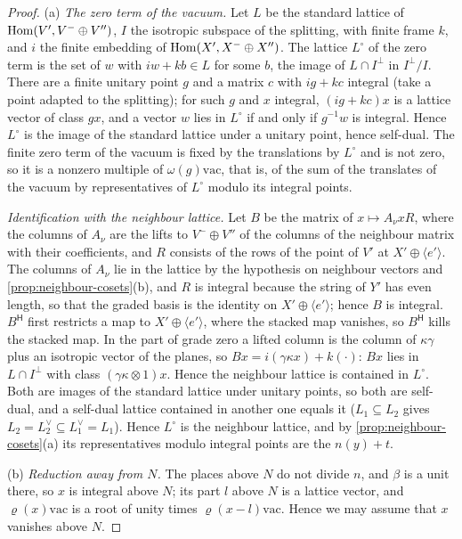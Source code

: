 \begin{proof}
(a) \emph{The zero term of the vacuum.} Let $L$ be the standard lattice of $\operatorname{Hom}(V',V^-\oplus V'')$, $I$ the isotropic subspace of the splitting, with finite frame $k$, and $i$ the finite embedding of $\operatorname{Hom}(X',X^-\oplus X'')$. The lattice $L^\circ$ of the zero term is the set of $w$ with $iw+kb\in L$ for some $b$, the image of
$L\cap I^\perp$ in $I^\perp/I$. There are a finite unitary point $g$ and a matrix $c$ with $ig+kc$ integral (take a point adapted to the splitting); for such $g$ and $x$ integral, $(ig+kc)x$ is a lattice vector of class $gx$, and a vector $w$ lies in $L^\circ$ if and only if $g^{-1}w$ is integral. Hence $L^\circ$ is the image of the standard lattice under a
unitary point, hence self-dual. The finite zero term of the vacuum is fixed by the translations by $L^\circ$ and is not zero, so it is a nonzero multiple of $\omega(g)\mathrm{vac}$, that is, of the sum of the translates of the vacuum by representatives of $L^\circ$ modulo its integral points.

\emph{Identification with the neighbour lattice.} Let $B$ be the matrix of $x\mapsto A_\nu xR$, where the columns of $A_\nu$ are the lifts to $V^-\oplus V''$ of the columns of the neighbour matrix with their coefficients, and $R$ consists of the rows of the point of $V'$ at $X'\oplus\langle e'\rangle$. The columns of $A_\nu$ lie in the lattice by the
hypothesis on neighbour vectors and \cref{prop:neighbour-cosets}(b), and $R$ is integral because the string of $Y'$ has even length, so that the graded basis is the identity on $X'\oplus\langle e'\rangle$; hence $B$ is integral. $B^{\mathsf H}$ first restricts a map to $X'\oplus\langle e'\rangle$, where the stacked map vanishes, so $B^{\mathsf H}$
kills the stacked map. In the part of grade zero a lifted column is the column of $\kappa\gamma$ plus an isotropic vector of the planes, so $Bx=i(\gamma\kappa x)+k(\cdot)$: $Bx$ lies in $L\cap I^\perp$ with class $(\gamma\kappa\otimes1)x$. Hence the neighbour lattice is contained in $L^\circ$. Both are images of the standard lattice under unitary
points, so both are self-dual, and a self-dual lattice contained in another one equals it ($L_1\subseteq L_2$ gives $L_2=L_2^\vee\subseteq L_1^\vee=L_1$). Hence $L^\circ$ is the neighbour lattice, and by \cref{prop:neighbour-cosets}(a) its representatives modulo integral points are the $n(y)+t$.

(b) \emph{Reduction away from $N$.} The places above $N$ do not divide $n$, and $\beta$ is a unit there, so $x$ is integral above $N$; its part $l$ above $N$ is a lattice vector, and $\varrho(x)\mathrm{vac}$ is a root of unity times $\varrho(x-l)\mathrm{vac}$. Hence we may assume that $x$ vanishes above $N$.


\end{proof}
